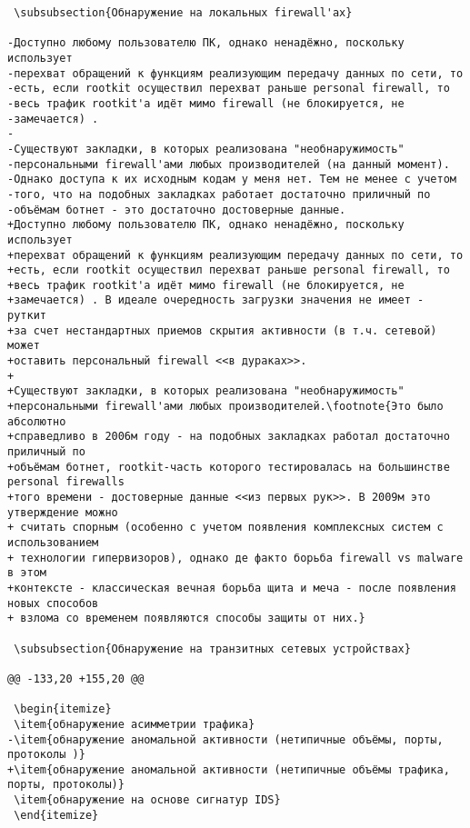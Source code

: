 \begin{verbatim}
 \subsubsection{Обнаружение на локальных firewall'ах}

-Доступно любому пользователю ПК, однако ненадёжно, поскольку использует
-перехват обращений к функциям реализующим передачу данных по сети, то
-есть, если rootkit осуществил перехват раньше personal firewall, то
-весь трафик rootkit'а идёт мимо firewall (не блокируется, не
-замечается) .
-
-Существуют закладки, в которых реализована "необнаружимость"
-персональными firewall'ами любых производителей (на данный момент).
-Однако доступа к их исходным кодам у меня нет. Тем не менее с учетом
-того, что на подобных закладках работает достаточно приличный по
-объёмам ботнет - это достаточно достоверные данные.
+Доступно любому пользователю ПК, однако ненадёжно, поскольку использует
+перехват обращений к функциям реализующим передачу данных по сети, то
+есть, если rootkit осуществил перехват раньше personal firewall, то
+весь трафик rootkit'а идёт мимо firewall (не блокируется, не
+замечается) . В идеале очередность загрузки значения не имеет - руткит
+за счет нестандартных приемов скрытия активности (в т.ч. сетевой) может
+оставить персональный firewall <<в дураках>>.
+
+Существуют закладки, в которых реализована "необнаружимость"
+персональными firewall'ами любых производителей.\footnote{Это было абсолютно
+справедливо в 2006м году - на подобных закладках работал достаточно приличный по
+объёмам ботнет, rootkit-часть которого тестировалась на большинстве personal firewalls
+того времени - достоверные данные <<из первых рук>>. В 2009м это утверждение можно
+ считать спорным (особенно с учетом появления комплексных систем с использованием
+ технологии гипервизоров), однако де факто борьба firewall vs malware в этом
+контексте - классическая вечная борьба щита и меча - после появления новых способов
+ взлома со временем появляются способы защиты от них.}

 \subsubsection{Обнаружение на транзитных сетевых устройствах}

@@ -133,20 +155,20 @@

 \begin{itemize}
 \item{обнаружение асимметрии трафика}
-\item{обнаружение аномальной активности (нетипичные объёмы, порты, протоколы )}
+\item{обнаружение аномальной активности (нетипичные объёмы трафика, порты, протоколы)}
 \item{обнаружение на основе сигнатур IDS}
 \end{itemize}



\end{verbatim}
